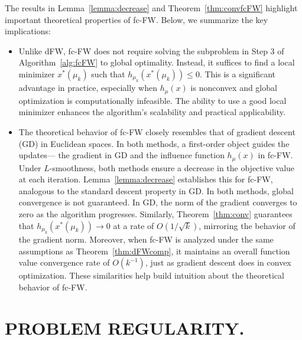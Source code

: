 \documentclass[stsy,sglanonrev]{informs4}
\begin{document}
The results in Lemma~\ref{lemma:decrease} and Theorem~\ref{thm:convfcFW} highlight important theoretical properties of fc-FW. Below, we summarize the key implications:

\begin{itemize}
    \item[(a)] Unlike dFW, fc-FW does not require solving the subproblem in Step 3 of Algorithm~\ref{alg:fcFW} to global optimality. Instead, it suffices to find a local minimizer \( x^*(\mu_k) \) such that \( h_{\mu_k}(x^*(\mu_k)) \leq 0 \). This is a significant advantage in practice, especially when \( h_{\mu}(x) \) is nonconvex and global optimization is computationally infeasible. The ability to use a good local minimizer enhances the algorithm's scalability and practical applicability.
    \item[(b)] The theoretical behavior of fc-FW closely resembles that of gradient descent (GD) in Euclidean spaces. In both methods, a first-order object guides the updates— the gradient in GD and the influence function \( h_{\mu}(x) \) in fc-FW. Under \( L \)-smoothness, both methods ensure a decrease in the objective value at each iteration. Lemma~\ref{lemma:decrease} establishes this for fc-FW, analogous to the standard descent property in GD. In both methods, global convergence is not guaranteed. In GD, the norm of the gradient converges to zero as the algorithm progresses. Similarly, Theorem~\ref{thm:conv} guarantees that \( h_{\mu_k}(x^*(\mu_k)) \to 0 \) at a rate of \( O(1/\sqrt{k}) \), mirroring the behavior of the gradient norm. Moreover, when fc-FW is analyzed under the same assumptions as Theorem~\ref{thm:dFWcomp}, it maintains an overall function value convergence rate of \( O(k^{-1}) \), just as gradient descent does in convex optimization. These similarities help build intuition about the theoretical behavior of fc-FW.
\end{itemize}


    

\section{PROBLEM REGULARITY.}\label{sec:regularity}
\end{document}
